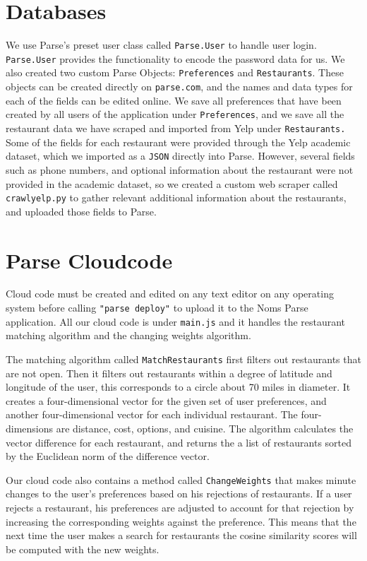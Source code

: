 \documentclass[12pt]{article}
\begin{document}
\section{Databases}
We use Parse's preset user class called \texttt{Parse.User} to handle user login. \texttt{Parse.User} provides the functionality to encode the password data for us.  We also created two custom Parse Objects: \texttt{Preferences} and \texttt{Restaurants}. These objects can be created directly on \texttt{parse.com}, and the names and data types for each of the fields can be edited online.  We save all preferences that have been created by all users of the application under \texttt{Preferences}, and we save all the restaurant data we have scraped and imported from Yelp under \texttt{Restaurants.}
Some of the fields for each restaurant were provided through the Yelp academic dataset, which we imported as a \texttt{JSON} directly into Parse.  However, several fields such as phone numbers, and optional information about the restaurant were not provided in the academic dataset, so we created a custom web scraper called \texttt{crawlyelp.py} to gather relevant additional information about the restaurants, and uploaded those fields to Parse.

\section{Parse Cloudcode}
Cloud code must be created and edited on any text editor on any operating system before calling \texttt{"parse deploy"} to upload it to the Noms Parse application.  All our cloud code is under \texttt{main.js} and it handles the restaurant matching algorithm and the changing weights algorithm. 

The matching algorithm called \texttt{MatchRestaurants} first filters out restaurants that are not open. Then it filters out restaurants within a degree of latitude and longitude of the user, this corresponds to a circle about 70 miles in diameter. It creates a four-dimensional vector for the given set of user preferences, and another four-dimensional vector for each individual restaurant.  The four-dimensions are distance, cost, options, and cuisine. The algorithm calculates the vector difference for each restaurant, and returns the a list of restaurants sorted by the Euclidean norm of the difference vector.

Our cloud code also contains a method called \texttt{ChangeWeights} that makes minute changes to the user's preferences based on his rejections of restaurants.  If a user rejects a restaurant, his preferences are adjusted to account for that rejection by increasing the corresponding weights against the preference. This means that the next time the user makes a search for restaurants the cosine similarity scores will be computed with the new weights.
\end{document}
